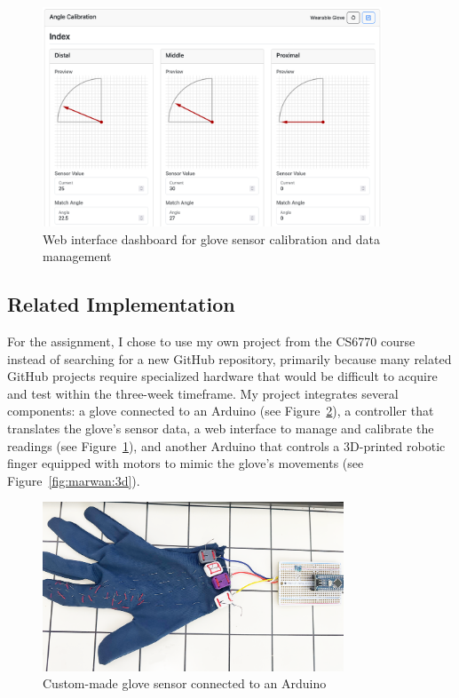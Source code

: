 \begin{figure}[h]
  \centering
  \includegraphics[width=0.90\textwidth]{images/dashboard-simulator-values.png}
  \caption{Web interface dashboard for glove sensor calibration and data management}
  \label{fig:marwan:web}
\end{figure}

\subsection{Related Implementation}
For the assignment, I chose to use my own project from the CS6770 course instead of searching for a new GitHub repository, primarily because many related GitHub projects require specialized hardware that would be difficult to acquire and test within the three-week timeframe. My project integrates several components: a glove connected to an Arduino (see Figure~\ref{fig:marwan:glove}), a controller that translates the glove's sensor data, a web interface to manage and calibrate the readings (see Figure~\ref{fig:marwan:web}), and another Arduino that controls a 3D-printed robotic finger equipped with motors to mimic the glove's movements (see Figure~\ref{fig:marwan:3d}).

\begin{figure}[h]
  \centering
  \includegraphics[width=0.80\textwidth]{images/glove-outside.png}
  \caption{Custom-made glove sensor connected to an Arduino}
  \label{fig:marwan:glove}
\end{figure}


